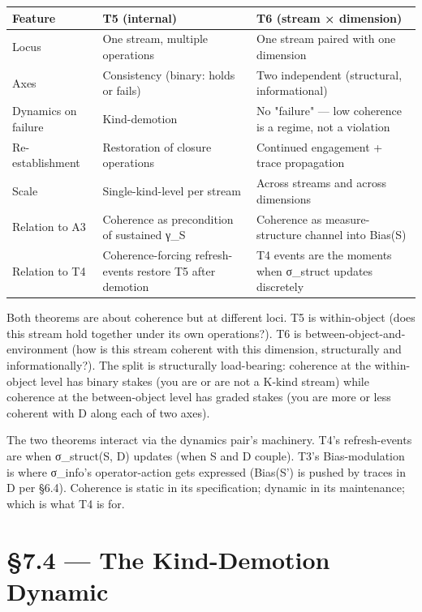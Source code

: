 \documentclass[11pt, openany]{book}
\newcommand{\sectionbreak}{\clearpage}
\begin{document}
\begingroup\setlength{\tabcolsep}{3pt}\renewcommand{\arraystretch}{1.15}\footnotesize
\begin{center}
\begin{tabular}{p{0.61in} p{1.86in} p{1.86in}}
\toprule
Feature & T5 (internal) & T6 (stream × dimension) \\
\midrule
Locus & One stream, multiple operations & One stream paired with one dimension \\
Axes & Consistency (binary: holds or fails) & Two independent (structural, informational) \\
Dynamics on failure & Kind-demotion & No "failure" --- low coherence is a regime, not a violation \\
Re-establishment & Restoration of closure operations & Continued engagement + trace propagation \\
Scale & Single-kind-level per stream & Across streams and across dimensions \\
Relation to A3 & Coherence as precondition of sustained γ\_\allowbreak{}S & Coherence as measure-structure channel into Bias(S) \\
Relation to T4 & Coherence-forcing refresh-events restore T5 after demotion & T4 events are the moments when σ\_\allowbreak{}struct updates discretely \\
\bottomrule
\end{tabular}
\end{center}
\endgroup
Both theorems are about coherence but at different loci. T5 is within-object (does this stream hold together under its own operations?). T6 is between-object-and-environment (how is this stream coherent with this dimension, structurally and informationally?). The split is structurally load-bearing: coherence at the within-object level has binary stakes (you are or are not a K-kind stream) while coherence at the between-object level has graded stakes (you are more or less coherent with D along each of two axes).

The two theorems interact via the dynamics pair's machinery. T4's refresh-events are when σ\_\allowbreak{}struct(S, D) updates (when S and D couple). T3's Bias-modulation is where σ\_\allowbreak{}info's operator-action gets expressed (Bias(S') is pushed by traces in D per §6.4). Coherence is static in its specification; dynamic in its maintenance; which is what T4 is for.

\sectionbreak

\section{§7.4 --- The Kind-Demotion Dynamic}
\end{document}
